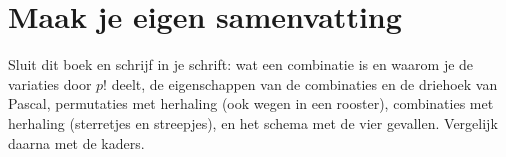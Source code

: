 \begin{oefeningen}







\end{oefeningen}


\ifzelfstudie
\section*{Maak je eigen samenvatting}
Sluit dit boek en schrijf in je schrift: wat een combinatie is en waarom je de variaties door $p!$ deelt, de eigenschappen van de combinaties en de driehoek van Pascal, permutaties met herhaling (ook wegen in een rooster), combinaties met herhaling (sterretjes en streepjes), en het schema met de vier gevallen. Vergelijk daarna met de kaders.
\fi

